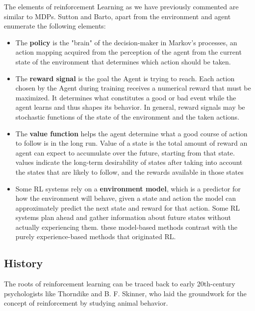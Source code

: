 The elements of reinforcement Learning as we have previously commented are similar to MDPs. Sutton and Barto\cite{sutton2018reinforcement}, apart from the environment and agent enumerate the following elements:

\begin{itemize}
    \item The \textbf{policy} is the "brain" of the decision-maker in Markov's processes, an action mapping acquired from the perception of the agent from the current state of the environment that determines which action should be taken.
    
    \item The \textbf{reward signal} is the goal the Agent is trying to reach. Each action chosen by the Agent during training receives a numerical reward that must be maximized. It determines what constitutes a good or bad event while the agent learns and thus shapes its behavior. In general, reward signals may be stochastic functions of the state of the environment and the taken actions.
    
    \item The \textbf{value function} helps the agent determine what a good course of action to follow is in the long run. Value of a state is the total amount of reward an agent can expect to accumulate over the future, starting from that state. values indicate the long-term desirability of states after taking into account the states that are likely to follow, and the rewards available in those states
     
    \item Some RL systems rely on a \textbf{environment model}, which is a predictor for how the environment will behave, given a state and action the model can approximately predict the next state and reward for that action. Some RL systems plan ahead and gather information about future states without actually experiencing them. these model-based methods contrast with the purely experience-based methods that originated RL.
\end{itemize}

\subsection*{History}
The roots of reinforcement learning can be traced back to early 20th-century psychologists like Thorndike\cite{thorndike1932fundamentals} and B. F. Skinner\cite{skinner1958reinforcement, skinner2014contingencies}, who laid the groundwork for the concept of reinforcement by studying animal behavior.

